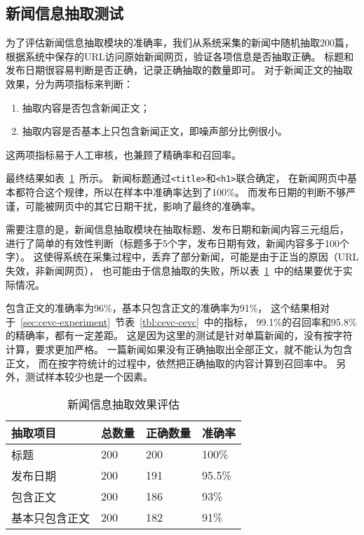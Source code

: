 \subsection{新闻信息抽取测试}

为了评估新闻信息抽取模块的准确率，我们从系统采集的新闻中随机抽取200篇，
根据系统中保存的URL访问原始新闻网页，验证各项信息是否抽取正确。
标题和发布日期很容易判断是否正确，记录正确抽取的数量即可。
对于新闻正文的抽取效果，分为两项指标来判断：
\begin{enumerate}
\item 抽取内容是否包含新闻正文；
\item 抽取内容是否基本上只包含新闻正文，即噪声部分比例很小。
\end{enumerate}
这两项指标易于人工审核，也兼顾了精确率和召回率。

最终结果如表~\ref{tbl:sys-evaluation}~所示。
新闻标题通过\texttt{<title>}和\texttt{<h1>}联合确定，
在新闻网页中基本都符合这个规律，所以在样本中准确率达到了100\%。
而发布日期的判断不够严谨，可能被网页中的其它日期干扰，影响了最终的准确率。

需要注意的是，新闻信息抽取模块在抽取标题、发布日期和新闻内容三元组后，
进行了简单的有效性判断（标题多于5个字，发布日期有效，新闻内容多于100个字）。
这使得系统在采集过程中，丢弃了部分新闻，可能是由于正当的原因（URL失效，非新闻网页），
也可能由于信息抽取的失败，所以表~\ref{tbl:sys-evaluation}~中的结果要优于实际情况。

包含正文的准确率为96\%，基本只包含正文的准确率为91\%，
这个结果相对于~\ref{sec:cevc-experiment}~节表~\ref{tbl:cevc-cevc}~中的指标，
99.1\%的召回率和95.8\%的精确率，都有一定差距。
这是因为这里的测试是针对单篇新闻的，没有按字符计算，要求更加严格。
一篇新闻如果没有正确抽取出全部正文，就不能认为包含正文，
而在按字符统计的过程中，依然把正确抽取的内容计算到召回率中。
另外，测试样本较少也是一个因素。

\begin{table}[htbp]
\caption{新闻信息抽取效果评估}
\label{tbl:sys-evaluation}
\vspace{0.5em}\centering\wuhao
\begin{tabular}{llll}
\toprule[1.5pt]
抽取项目 & 总数量 & 正确数量 & 准确率 \\
\midrule[1pt]
标题 & 200 & 200 & 100\% \\
发布日期 & 200 & 191 & 95.5\% \\  
包含正文 & 200 & 186 & 93\% \\
基本只包含正文 & 200 & 182 & 91\% \\
\bottomrule[1.5pt]
\end{tabular}
\end{table}

